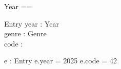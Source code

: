 \documentclass[a4paper,10pt,fleqn]{article}
\begin{document}
\begin{zed}
[Genre]
\end{zed}

\begin{zed}
Year == \nat
\end{zed}

\begin{schema}{Entry}
year : Year \\
genre : Genre \\
code : \nat
\end{schema}

\begin{axdef}
e : Entry
\where
e.year = 2025 \land e.code = 42
\end{axdef}
\end{document}
